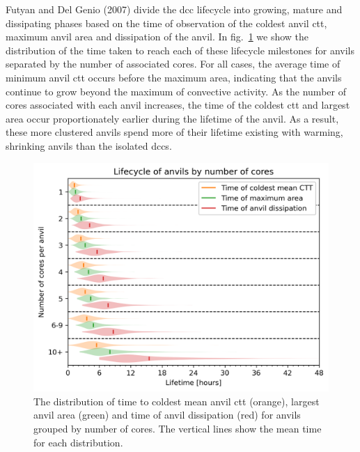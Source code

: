 Futyan and Del Genio (2007) divide the \acrshort{dcc} lifecycle into growing,
mature and dissipating phases based on the time of observation of the
coldest anvil \acrshort{ctt}, maximum anvil area and dissipation of the anvil. In
fig.~\ref{fig:seviri_lifetime_dists} we show the distribution of the time taken to reach each of these
lifecycle milestones for anvils separated by the number of associated
cores. For all cases, the average time of minimum anvil \acrshort{ctt} occurs
before the maximum area, indicating that the anvils continue to grow
beyond the maximum of convective activity. As the number of cores
associated with each anvil increases, the time of the coldest \acrshort{ctt} and
largest area occur proportionately earlier during the lifetime of the
anvil. As a result, these more clustered anvils spend more of their
lifetime existing with warming, shrinking anvils than the isolated \acrshort{dcc}s.


\begin{figure}[tp]
    \includegraphics[width=\textwidth]{figures/ch3_08.png}
    \caption[
    The distribution of time to coldest mean anvil \acrshort{ctt}, largest anvil area and time of anvil dissipation
    ]{
    The distribution of time to coldest mean anvil \acrshort{ctt} (orange), largest anvil area (green) and time of anvil dissipation (red) for anvils grouped by number of cores. The vertical lines show the mean time for each distribution.
    }
    \label{fig:seviri_lifetime_dists}
\end{figure}


